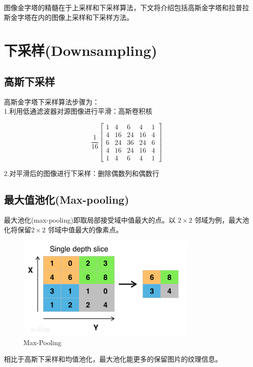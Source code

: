 \documentclass[12pt]{article}
\begin{document}
	图像金字塔的精髓在于上采样和下采样算法，下文将介绍包括高斯金字塔和拉普拉斯金字塔在内的图像上采样和下采样方法。
	
	\section{下采样(Downsampling)}
		
		\subsection{高斯下采样}
		
		高斯金字塔下采样算法步骤为：\\
		
		
		1.利用低通滤波器对源图像进行平滑：高斯卷积核
		
		$$
		\frac{1}{16}\left[\begin{array}{ccccc}
			1 & 4 & 6 & 4 & 1 \\
			4 & 16 & 24 & 16 & 4 \\
			6 & 24 & 36 & 24 & 6 \\
			4 & 16 & 24 & 16 & 4 \\
			1 & 4 & 6 & 4 & 1
		\end{array}\right]
		$$
		
		2.对平滑后的图像进行下采样：删除偶数列和偶数行
		
		\subsection{最大值池化(Max-pooling)}
		最大池化(max-pooling)即取局部接受域中值最大的点。以 $2\times2$ 邻域为例，最大池化将保留$2\times2$ 邻域中值最大的像素点。
		
		\begin{figure}[H]
			\centering
			\includegraphics[width=3.5in]{./maxpool.png}
			\centering
			\caption{Max-Pooling}
		\end{figure}
		
		相比于高斯下采样和均值池化，最大池化能更多的保留图片的纹理信息。
		
\end{document}
